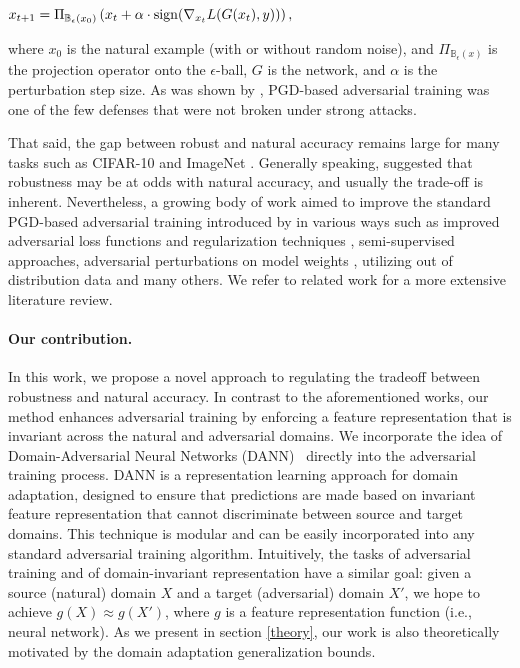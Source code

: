 \begin{center}
    $x_{t+1}=\Pi_{\mathbb{B}_\epsilon{(x_0)}}\left( x_{t} + \alpha\cdot \operatorname{sign}(\nabla_{x_{t}}L(G(x_{t}),y)) \right),$
\end{center}


where $x_0$ is the natural example (with or without random noise), and $\Pi_{\mathbb{B}_\epsilon{(x)}}$ is the projection operator onto the $\epsilon$-ball, $G$ is the network, and $\alpha$ is the perturbation step size.  As was shown by \citet{athalye2018obfuscated}, PGD-based adversarial training was one of the few defenses that were not broken under strong attacks.

That said, the gap between robust and natural accuracy remains large
for many tasks such as CIFAR-10 \citep{krizhevsky2009learning} and ImageNet \citep{deng2009imagenet}. Generally speaking, \citet{tsipras2018robustness} suggested that robustness may be at odds with natural accuracy, and usually the trade-off is inherent. Nevertheless, a growing body of work aimed to improve the standard PGD-based adversarial training introduced by \citet{madry2017towards} in various ways such as improved adversarial loss functions and regularization techniques \citep{kannan2018adversarial, wang2019improving, zhang2019theoretically}, semi-supervised approaches\citep{carmon2019unlabeled, uesato2019labels, zhai2019adversarially}, adversarial perturbations on model weights \citep{wu2020adversarial}, utilizing out of distribution data \citep{lee2021removing}
and many others. 
We refer to related work
for a more extensive literature review.

\paragraph{Our contribution.} In this work, we  propose a novel approach to regulating
the tradeoff between robustness and natural accuracy. In contrast to the aforementioned works, our method enhances adversarial training by enforcing a feature representation that is invariant across the natural and adversarial domains. We incorporate the idea of Domain-Adversarial Neural Networks (DANN)~\citep{ ganin2015unsupervised, ganin2016domain} directly into the adversarial training process. DANN is a representation learning approach for domain adaptation, designed to ensure that predictions are made based on invariant feature representation that cannot discriminate between source and target domains. This technique is modular and can be easily incorporated into any standard adversarial training algorithm. Intuitively, the tasks of adversarial training and of domain-invariant representation have a similar goal: given a source (natural) domain $X$ and a target (adversarial) domain $X'$, we hope to achieve $g(X) \approx g(X')$, where $g$ is a feature representation function (i.e., neural network). As we present in section \ref{theory}, our work is also theoretically motivated by the domain adaptation generalization bounds.

